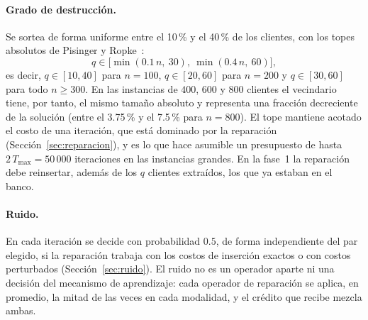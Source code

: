 \paragraph{Grado de destrucción.} Se sortea de forma uniforme entre el 10\,\% y el 40\,\% de
los clientes, con los topes absolutos de Pisinger y Ropke~\cite{pisinger2007}:
\[
q\in\bigl[\min(0.1\,n,\ 30),\ \min(0.4\,n,\ 60)\bigr],
\]
es decir, $q\in[10,40]$ para $n=100$, $q\in[20,60]$ para $n=200$ y $q\in[30,60]$ para todo
$n\ge 300$. En las instancias de $400$, $600$ y $800$ clientes el vecindario tiene, por tanto,
el mismo tamaño absoluto y representa una fracción decreciente de la solución (entre el
3.75\,\% y el 7.5\,\% para $n=800$). El tope mantiene acotado el costo de una iteración, que
está dominado por la reparación (Sección~\ref{sec:reparacion}), y es lo que hace asumible un
presupuesto de hasta $2\,T_{\max}=50\,000$ iteraciones en las instancias grandes. En la fase~1
la reparación debe reinsertar, además de los $q$ clientes extraídos, los que ya estaban en el
banco.

\paragraph{Ruido.} En cada iteración se decide con probabilidad $0.5$, de forma independiente
del par elegido, si la reparación trabaja con los costos de inserción exactos o con costos
perturbados (Sección~\ref{sec:ruido}). El ruido no es un operador aparte ni una decisión del
mecanismo de aprendizaje: cada operador de reparación se aplica, en promedio, la mitad de las
veces en cada modalidad, y el crédito que recibe mezcla ambas.
